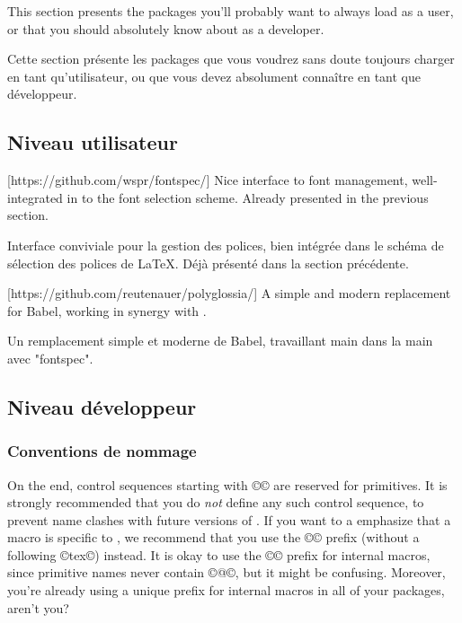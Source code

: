 \documentclass{lltxdoc}
\begin{document}
This section presents the packages you'll probably want to always load as a
user, or that you should absolutely know about as a developer.

Cette section présente les packages que vous voudrez sans doute toujours charger en tant qu'utilisateur, ou que vous devez absolument connaître en tant que développeur.

\subsection{Niveau utilisateur}

[https://github.com/wspr/fontspec/]
Nice interface to font management, well-integrated in to the \latex font
selection scheme. Already presented in the previous section.

Interface conviviale pour la gestion des polices, bien intégrée dans le schéma de sélection des polices de LaTeX. Déjà présenté dans la section précédente.

[https://github.com/reutenauer/polyglossia/]
A simple and modern replacement for Babel, working in synergy with .

Un remplacement simple et moderne de Babel, travaillant main dans la main avec "fontspec".

\subsection{Niveau développeur}

\subsubsection{Conventions de nommage}

On the \tex end, control sequences starting with ©\luatex© are reserved for
primitives. It is strongly recommended that you do \emph{not} define any such
control sequence, to prevent name clashes with future versions of \luatex. If
you want to a emphasize that a macro is specific to \luatex, we recommend that
you use the ©\lua© prefix (without a following ©tex©) instead. It is okay to
use the ©\luatex@© prefix for internal macros, since primitive names never
contain ©@©, but it might be confusing. Moreover, you're already using a
unique prefix for internal macros in all of your packages, aren't you?
\end{document}
